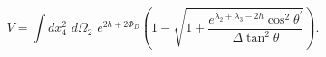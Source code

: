 \begin{equation}
V= \int dx_4^2 \,\,  d\Omega_2 \,\,  e^{2h+2\Phi_D}\left ( 1-\sqrt{1+\frac{e^{\lambda_2+\lambda_3-2h} \cos^2\theta^\prime}{\Delta \tan^2\theta}}\right ).
\end{equation}


